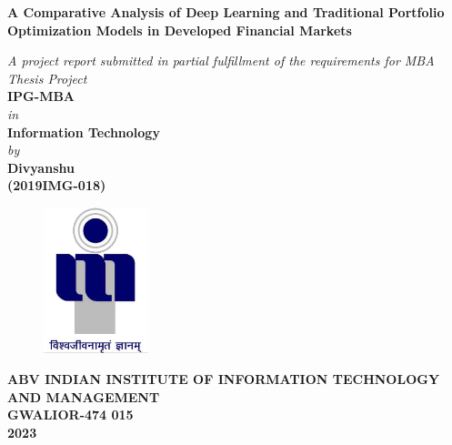 \title{}
\author{}
\thispagestyle{empty}

\begin{titlepage}
\begin{center}
{\LARGE \bf A Comparative Analysis of Deep Learning and Traditional Portfolio Optimization Models in Developed Financial Markets} \\
\end{center}
\begin{center}
\vspace{0.6in}
{\large \it A project report submitted in partial fulfillment of the requirements for MBA Thesis Project} \\
\vspace{0.4in}
{\large \bf IPG-MBA\\\vspace{0.2in}}
{\large \it in\\}
{\large \bf \vspace{0.2in}Information Technology\\}
\vspace{0.4in}
{\large \it by\\}
\vspace{0.3in}
{\large \bf Divyanshu\\(2019IMG-018)}\\
\end {center}
\vspace{0.6in}
\begin{figure}[H]
\centerline{\includegraphics[width=1.2in]{iiitm}}
\end{figure}
\begin{center}
{\Large \bf ABV INDIAN INSTITUTE OF INFORMATION TECHNOLOGY AND MANAGEMENT\\
GWALIOR-474 015\\}
\vspace{0.2in}
{\Large \bf 2023\\}
\end{center}
\end{titlepage}
